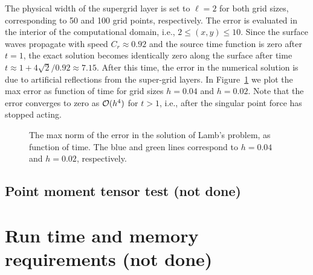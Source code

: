 \documentclass[11pt]{report}
\begin{document}
The physical width of the supergrid layer is set to $\ell=2$ for both grid sizes, corresponding to
50 and 100 grid points, respectively. The error is evaluated in the interior of the computational
domain, i.e., $2\leq (x,y) \leq 10$. Since the surface waves propagate with speed $C_r\approx 0.92$
and the source time function is zero after $t=1$, the exact solution becomes identically zero along
the surface after time $t\approx 1 + 4\sqrt{2}/0.92 \approx 7.15$. After this time, the error in the
numerical solution is due to artificial reflections from the super-grid layers. In
Figure~\ref{fig:lamb-err} we plot the max error as function of time for grid sizes $h=0.04$ and
$h=0.02$. Note that the error converges to zero as ${\cal O}(h^4)$ for $t>1$, i.e., after the
singular point force has stopped acting.
\begin{figure}[ht]
\begin{center}
\caption{The max norm of the error in the solution of Lamb's problem, as function of time. The blue
and green lines correspond to $h=0.04$ and $h=0.02$, respectively.}
\label{fig:lamb-err}
\end{center}
\end{figure}


\section{Point moment tensor test (not done)}\label{sec:testpointsource}

\chapter{Run time and memory requirements (not done)}\label{sec:performance}
\end{document}
